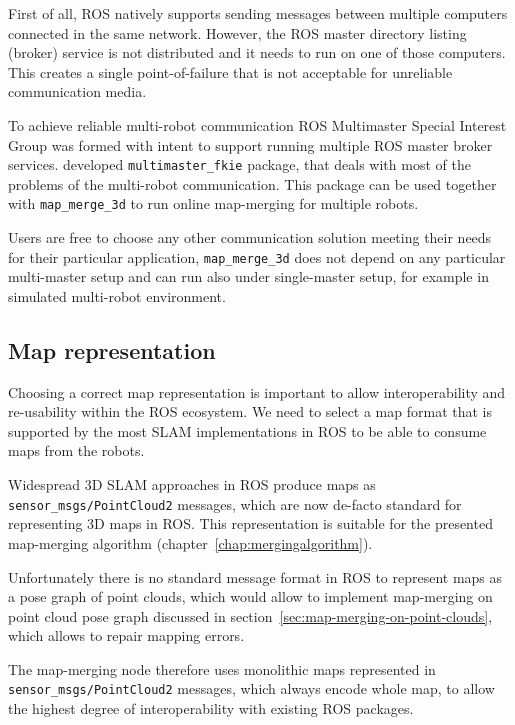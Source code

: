 First of all, \gls{ROS} natively supports sending messages between multiple computers connected in the same network. However, the \gls{ROS} master directory listing (broker) service is not distributed and it needs to run on one of those computers. This creates a single point-of-failure that is not acceptable for unreliable communication media.

To achieve reliable multi-robot communication \gls{ROS} Multimaster Special Interest Group was formed with intent to support running multiple \gls{ROS} master broker services. \citet{hernadez2015multi} developed \texttt{multimaster\_fkie} package, that deals with most of the problems of the multi-robot communication. This package can be used together with \texttt{map\_merge\_3d} to run online map-merging for multiple robots.

Users are free to choose any other communication solution meeting their needs for their particular application, \texttt{map\_merge\_3d} does not depend on any particular multi-master setup and can run also under single-master setup, for example in simulated multi-robot environment.

\subsection{Map representation}
\label{sec:map-representation}

Choosing a correct map representation is important to allow interoperability and re-usability within the \gls{ROS} ecosystem. We need to select a map format that is supported by the most \gls{SLAM} implementations in \gls{ROS} to be able to consume maps from the robots.

Widespread \gls{3D} \gls{SLAM} approaches in \gls{ROS} produce maps as \texttt{sen\-sor\_msgs/\-Point\-Cloud2} messages, which are now de-facto standard for representing \gls{3D} maps in \gls{ROS}. This representation is suitable for the presented map-merging algorithm (chapter~\ref{chap:mergingalgorithm}).

Unfortunately there is no standard message format in \gls{ROS} to represent maps as a pose graph of point clouds, which would allow to implement map-merging on point cloud pose graph discussed in section~\ref{sec:map-merging-on-point-clouds}, which allows to repair mapping errors.

The map-merging node therefore uses monolithic maps represented in \texttt{sen\-sor\_msgs/\-Point\-Cloud2} messages, which always encode whole map, to allow the highest degree of interoperability with existing \gls{ROS} packages.

